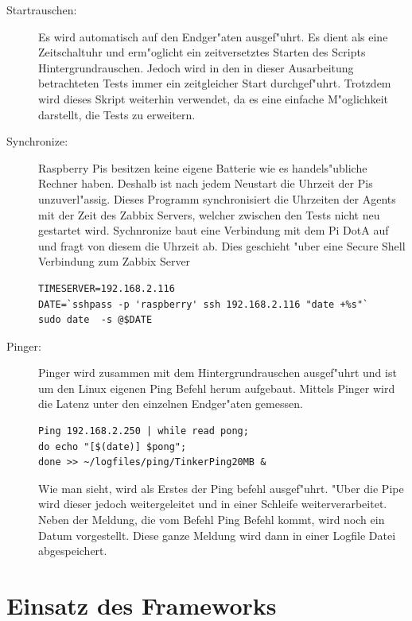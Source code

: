 \begin{enumerate}
\begin{description}
\item[Startrauschen:]Es wird automatisch auf den Endger"aten ausgef"uhrt. Es dient als eine Zeitschaltuhr %
und erm"oglicht ein zeitversetztes Starten des Scripts Hintergrundrauschen. %
Jedoch wird in den in dieser Ausarbeitung betrachteten Tests immer ein zeitgleicher Start %
durchgef"uhrt. Trotzdem wird dieses Skript weiterhin verwendet, da es eine einfache %
M"oglichkeit darstellt, die Tests zu erweitern. %

\item[Synchronize:]Raspberry Pis besitzen keine eigene Batterie wie es handels"ubliche Rechner haben. %
Deshalb ist nach jedem Neustart die Uhrzeit der Pis unzuverl"assig. Dieses Programm synchronisiert %
die Uhrzeiten der Agents mit der Zeit des Zabbix Servers, welcher zwischen den Tests nicht neu gestartet wird. %
Sychnronize baut eine Verbindung mit dem Pi DotA auf und fragt von diesem die Uhrzeit ab. %
Dies geschieht "uber eine Secure Shell Verbindung zum Zabbix Server %
\begin{verbatim}
TIMESERVER=192.168.2.116
DATE=`sshpass -p 'raspberry' ssh 192.168.2.116 "date +%s"`
sudo date  -s @$DATE 
\end{verbatim}

\item[Pinger:]Pinger wird zusammen mit dem Hintergrundrauschen ausgef"uhrt und ist um den Linux eigenen Ping Befehl %
herum aufgebaut. Mittels Pinger wird die Latenz unter den einzelnen Endger"aten gemessen. %
\begin{verbatim}
Ping 192.168.2.250 | while read pong; 
do echo "[$(date)] $pong"; 
done >> ~/logfiles/ping/TinkerPing20MB &
\end{verbatim}
Wie man sieht, wird als Erstes der Ping befehl ausgef"uhrt. "Uber die Pipe wird dieser jedoch weitergeleitet und in %
einer Schleife weiterverarbeitet. Neben der Meldung, die vom Befehl Ping Befehl kommt, wird noch ein Datum vorgestellt. %
Diese ganze Meldung wird dann in einer Logfile Datei abgespeichert. %
\end{description}
\end{enumerate}
\section{Einsatz des Frameworks} 

